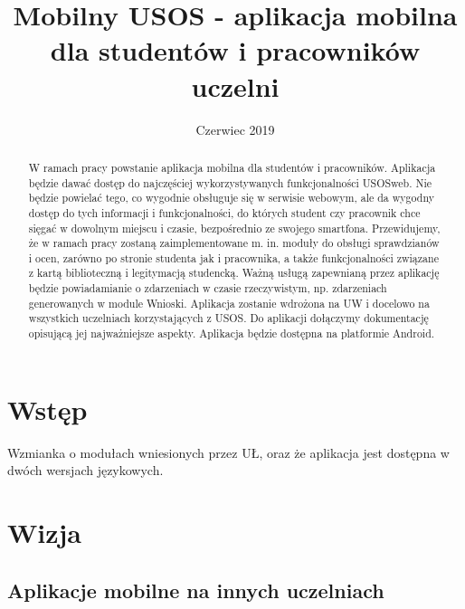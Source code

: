 \documentclass{pracamgr}
\title{Mobilny USOS - aplikacja mobilna dla studentów i pracowników uczelni}
\date{Czerwiec 2019}
\begin{document}
\maketitle
\begin{abstract}
  W ramach pracy powstanie aplikacja mobilna dla
  studentów i pracowników. Aplikacja będzie dawać dostęp do najczęściej wykorzystywanych 
  funkcjonalności USOSweb. Nie będzie powielać tego, co wygodnie obsługuje się w serwisie 
  webowym, ale da wygodny dostęp do tych informacji i funkcjonalności, do których student czy 
  pracownik chce sięgać w dowolnym miejscu i czasie, bezpośrednio ze swojego smartfona. 
  Przewidujemy, że w ramach pracy zostaną zaimplementowane m. in. moduły do obsługi 
  sprawdzianów i ocen, zarówno po stronie studenta jak i pracownika, a także funkcjonalności 
  związane z kartą biblioteczną i legitymacją studencką. Ważną usługą zapewnianą przez 
  aplikację będzie powiadamianie o zdarzeniach w czasie rzeczywistym, np. zdarzeniach 
  generowanych w module Wnioski. Aplikacja zostanie wdrożona na UW i docelowo na 
  wszystkich uczelniach korzystających z USOS. Do aplikacji dołączymy dokumentację opisującą 
  jej najważniejsze aspekty. Aplikacja będzie dostępna na platformie Android.
\end{abstract}

\tableofcontents

\setlength{\LTpost}{0pt} %

\chapter{Wstęp}

Wzmianka o modułach wniesionych przez UŁ, oraz że aplikacja jest dostępna
w dwóch wersjach językowych.


\chapter{Wizja}

\section{Aplikacje mobilne na innych uczelniach}
\end{document}
